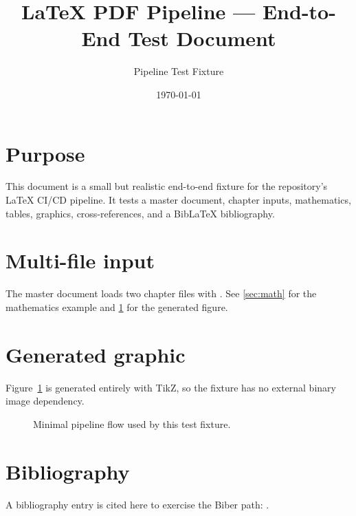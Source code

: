 \documentclass[11pt,a4paper]{article}
\title{LaTeX PDF Pipeline — End-to-End Test Document}
\author{Pipeline Test Fixture}
\date{\today}
\begin{document}
\maketitle
\tableofcontents

\section{Purpose}\label{sec:purpose}
This document is a small but realistic end-to-end fixture for the repository's LaTeX CI/CD pipeline. It tests a master document, chapter inputs, mathematics, tables, graphics, cross-references, and a BibLaTeX bibliography.

\section{Multi-file input}\label{sec:multifile}
The master document loads two chapter files with \verb||. See \cref{sec:math} for the mathematics example and \cref{fig:pipeline} for the generated figure.




\section{Generated graphic}\label{sec:figure}
Figure~\cref{fig:pipeline} is generated entirely with TikZ, so the fixture has no external binary image dependency.

\begin{figure}[htbp]
  \centering
  \caption{Minimal pipeline flow used by this test fixture.}
  \label{fig:pipeline}
\end{figure}

\section{Bibliography}\label{sec:bib}
A bibliography entry is cited here to exercise the Biber path: \parencite{lamport1994}.

\printbibliography
\end{document}
